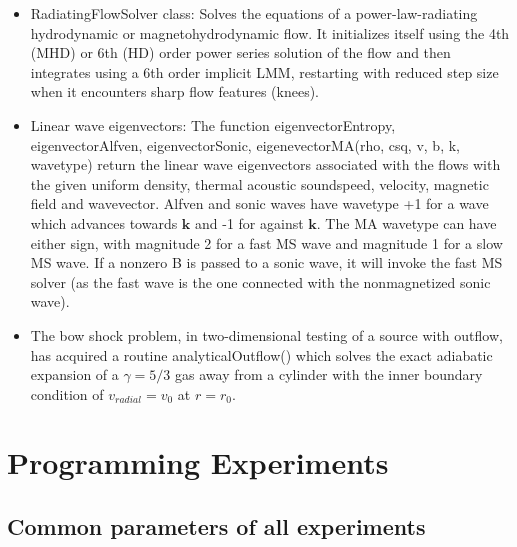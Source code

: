 \documentclass[letterpaper,12pt]{article}
\begin{document}
\begin{itemize}
\item RadiatingFlowSolver class: Solves the equations of a power-law-radiating hydrodynamic
or magnetohydrodynamic flow. It initializes itself using the 4th (MHD) or 6th (HD) order power
series solution of the flow and then integrates using a 6th order implicit LMM, restarting with
reduced step size when it encounters sharp flow features (knees).
\item Linear wave eigenvectors: The function eigenvectorEntropy, eigenvectorAlfven, eigenvectorSonic,
eigenevectorMA(rho, csq, v, b, k, wavetype) return the linear wave eigenvectors associated with the
flows with the given uniform density, thermal acoustic soundspeed, velocity, magnetic field and wavevector.
Alfven and sonic waves have wavetype +1 for a wave which advances towards $\mathbf{k}$ and -1 for
against $\mathbf{k}$. The MA wavetype can have either sign, with magnitude 2 for a fast MS
wave and magnitude 1 for a slow MS wave. If a nonzero B is passed to a sonic wave, it will invoke the
fast MS solver (as the fast wave is the one connected with the nonmagnetized sonic wave).
\item The bow shock problem, in two-dimensional testing of a source with outflow, has acquired a routine
analyticalOutflow() which solves the exact adiabatic expansion of a $\gamma=5/3$ gas away from a cylinder
with the inner boundary condition of $v_{radial} = v_0$ at $r=r_0$.
\end{itemize}

\section{Programming Experiments}

\subsection{Common parameters of all experiments}
\end{document}
